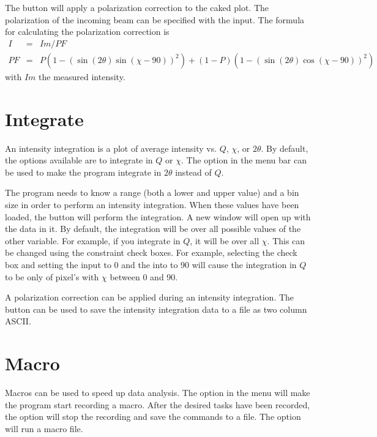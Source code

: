 The  button will apply a 
polarization correction to the caked plot. The polarization
of the incoming beam can be specified with the 
 input. The formula for calculating the 
polarization correction is
\begin{eqnarray}
    I&=&Im/PF \\ 
    PF&=&P(1 - (\sin(2\theta)\sin(\chi-90))^2) + 
    (1 - P)(1 - (\sin(2\theta)\cos(\chi-90))^2)
\end{eqnarray}
with $Im$ the measured intensity. 


\section{Integrate}

An intensity integration is a plot of average intensity
vs. $Q$, $\chi$, or $2\theta$. By default, the options 
available are to integrate in $Q$ or $\chi$. The 
 option in the menu bar can be used 
to make the program integrate in $2\theta$ instead of $Q$.  

The program needs to know a range (both a lower and upper value)
and a bin size in order to perform an intensity integration.
When these values have been loaded, the  button will 
perform the integration. A new window will open up with the
data in it. By default, the integration will be over all 
possible values of the other variable. For example, if you integrate 
in $Q$, it will be over all $\chi$. This can be changed using the
constraint check boxes. 
For example, selecting the 
check box and setting the  input to 0 and the
 into to 90 will cause the integration in $Q$
to be only of pixel's with $\chi$ between 0 and 90. 

A polarization correction can be applied during
an intensity integration. The  button can be used
to save the intensity integration data to a file as two column ASCII. 

\section{Macro}

Macros can be used to speed up data analysis. 
The  option in the  menu
will make the program start recording a macro. After the desired
tasks have been recorded, the  option will
stop the recording and save the commands to a file. The
 option will run a macro file.

